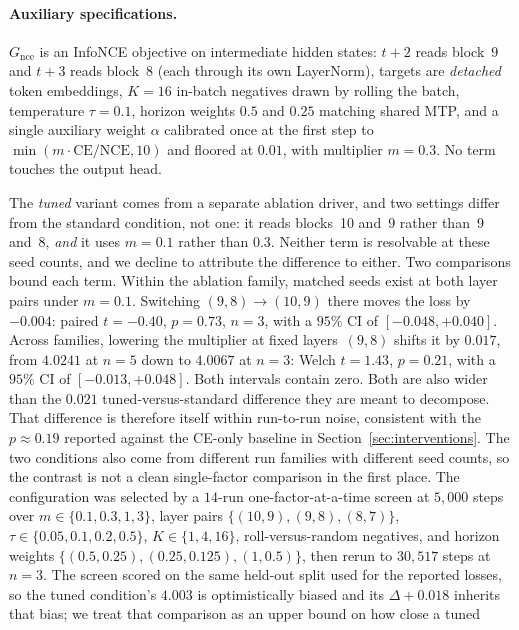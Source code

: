 \paragraph{Auxiliary specifications.} $G_{\text{nce}}$ is an InfoNCE objective on
intermediate hidden states: $t{+}2$ reads block~9 and $t{+}3$ reads block~8 (each
through its own LayerNorm), targets are \emph{detached} token embeddings, $K{=}16$
in-batch negatives drawn by rolling the batch, temperature $\tau{=}0.1$, horizon
weights $0.5$ and $0.25$ matching shared MTP, and a single auxiliary weight
$\alpha$ calibrated once at the first step to $\min(m\cdot\mathrm{CE}/\mathrm{NCE},
10)$ and floored at $0.01$, with multiplier $m{=}0.3$. No term touches the output
head.

The \emph{tuned} variant comes from a separate ablation driver, and two settings
differ from the standard condition, not one: it reads blocks~10 and~9 rather than~9
and~8, \emph{and} it uses $m{=}0.1$ rather than $0.3$. Neither term is resolvable at
these seed counts, and we decline to attribute the difference to either. Two comparisons bound each term.
Within the ablation family, matched seeds exist at both layer pairs under
$m{=}0.1$. Switching $(9,8)\to(10,9)$ there moves the loss by ${-}0.004$: paired
$t{=}{-}0.40$, $p{=}0.73$, $n{=}3$, with a $95\%$ CI of $[{-}0.048, {+}0.040]$.
Across families, lowering the multiplier at fixed layers~$(9,8)$ shifts it by
$0.017$, from $4.0241$ at $n{=}5$ down to $4.0067$ at $n{=}3$: Welch $t{=}1.43$,
$p{=}0.21$, with a $95\%$ CI of $[{-}0.013, {+}0.048]$.
Both intervals contain zero. Both are also wider than the
$0.021$ tuned-versus-standard difference they are meant to decompose. That
difference is therefore itself within run-to-run noise, consistent with the
$p \approx 0.19$ reported against the CE-only baseline in
Section~\ref{sec:interventions}. The two
conditions also come from different run families with different seed counts, so the
contrast is not a clean single-factor comparison in the first place. The
configuration was selected by a $14$-run one-factor-at-a-time screen at $5{,}000$
steps over $m \in \{0.1,0.3,1,3\}$, layer pairs $\{(10,9),(9,8),(8,7)\}$, $\tau \in
\{0.05,0.1,0.2,0.5\}$, $K \in \{1,4,16\}$, roll-versus-random negatives, and horizon
weights $\{(0.5,0.25),(0.25,0.125),(1,0.5)\}$, then rerun to $30{,}517$ steps at
$n{=}3$. The screen scored on the same held-out split used for the reported losses, so
the tuned condition's $4.003$ is optimistically biased and its $\Delta{+}0.018$
inherits that bias; we treat that comparison as an upper bound on how close a tuned
